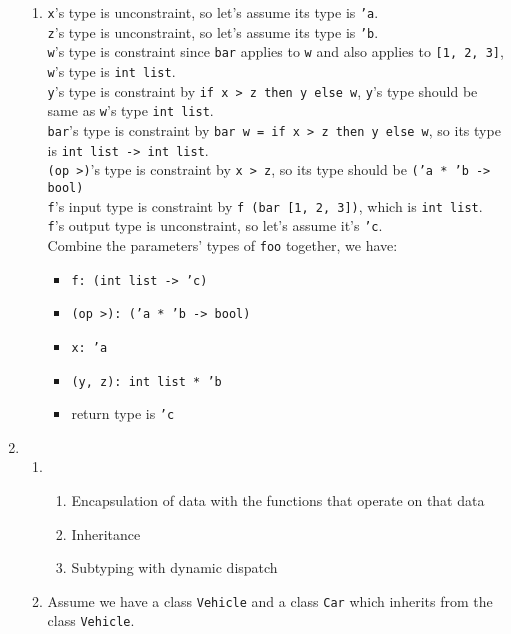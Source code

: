 \documentclass[a4paper,11pt]{article} %
\newcommand{\code}[1]{\texttt{#1}}
\begin{document}
\begin{enumerate}
\begin{enumerate}
    \item %
    \code{x}'s type is unconstraint, so let's assume its type is \code{'a}. \\
    \code{z}'s type is unconstraint, so let's assume its type is \code{'b}. \\
    \code{w}'s type is constraint since \code{bar} applies to \code{w} and also applies
    to \code{[1, 2, 3]}, \code{w}'s type is \code{int list}. \\
    \code{y}'s type is constraint by \code{if x > z then y else w}, \code{y}'s type
    should be same as \code{w}'s type \code{int list}. \\
    \code{bar}'s type is constraint by \code{bar w = if x > z then y else w}, so its type
    is \code{int list -> int list}. \\
    \code{(op >)}'s type is constraint by \code{x > z}, so its type should be
    \code{('a * 'b -> bool)} \\
    \code{f}'s input type is constraint by \code{f (bar [1, 2, 3])}, which
    is \code{int list}. \\
    \code{f}'s output type is unconstraint, so let's assume it's \code{'c}. \\
    Combine the parameters' types of \code{foo} together, we have:

    \begin{itemize}
      \item \code{f:~(int list -> 'c)}
      \item \code{(op >):~('a * 'b -> bool)}
      \item \code{x:~'a}
      \item \code{(y, z):~int list * 'b}
      \item return type is \code{'c}
    \end{itemize}
  \end{enumerate}

  \item %
  \begin{enumerate}
    \item %
    \begin{enumerate}
      \item Encapsulation of data with the functions that operate on that data
      \item Inheritance
      \item Subtyping with dynamic dispatch
    \end{enumerate}
    \item %
    Assume we have a class \code{Vehicle} and a class \code{Car} which inherits
    from the class \code{Vehicle}.


\end{enumerate}
\end{enumerate}
\end{document}
